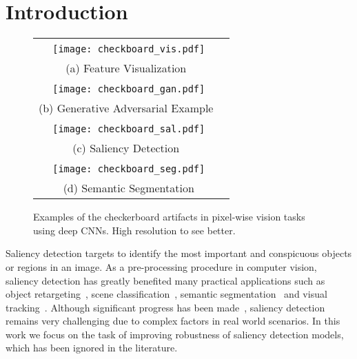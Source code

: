\documentclass[10pt,twocolumn,letterpaper]{article}
\begin{document}
\section{Introduction}
\begin{figure}
\centering
\begin{tabular}{@{}c}
\texttt{[image: checkboard\_vis.pdf]}\ \\
{\small(a) Feature Visualization~\cite{dosovitskiy2015inverting}}\ \\
\texttt{[image: checkboard\_gan.pdf]}\ \\
{\small(b) Generative Adversarial Example~\cite{salimans2016improved}}\ \\
\texttt{[image: checkboard\_sal.pdf]}\ \\
{\small(c) Saliency Detection~\cite{wang2016saliency}}\ \\
\texttt{[image: checkboard\_seg.pdf]}\ \\
{\small(d) Semantic Segmentation~\cite{noh2015learning}}\\
\end{tabular}
\caption{Examples of the checkerboard artifacts in pixel-wise vision tasks using deep CNNs.
High resolution to see better.
\label{fig:checkboard}}
\vspace{-5mm}
\end{figure}
Saliency detection targets to identify the most important and conspicuous objects or regions in an image.
As a pre-processing procedure in computer vision, saliency detection has greatly benefited many practical applications such as object retargeting~\cite{ding2011importance,sun2011scale}, scene classification~\cite{siagian2007rapid}, semantic segmentation~\cite{rother2004grabcut} and visual tracking~\cite{mahadevan2009saliency,hong2015online}.
Although significant progress has been made~\cite{hou2007saliency,alexe2010object,marchesotti2009framework,klein2011center,qin2015saliency,wang2016kernelized}, saliency detection remains very challenging due to complex factors in real world scenarios.
In this work we focus on the task of improving robustness of saliency detection models, which has been ignored in the literature.
\end{document}
